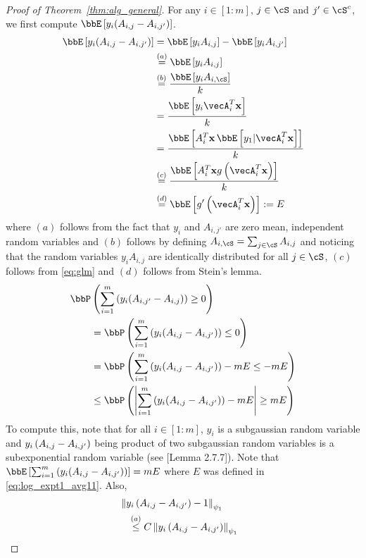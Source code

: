 \begin{proof}[Proof of Theorem~\ref{thm:alg_general}]
For any $i\in[1:m]$, $j\in\cS$ and $j'\in \cS^c$, we first compute $\bbE\insq{y_i (A_{i,j}-A_{i,j'})}$.
\begin{align}
\bbE\insq{y_i (A_{i,j}-A_{i,j'})} &= \bbE\insq{y_i A_{i,j}}-\bbE\insq{y_iA_{i,j'}}\nonumber\\
& \stackrel{(a)}{=} \bbE\insq{y_i A_{i,j}} \label{eq:log_expt11}\\
&\stackrel{(b)}{=}\frac{\bbE\insq{y_iA_{i,\cS}}}{k}\nonumber\\
& = \frac{\bbE\insq{y_i\vecA_{i}^T\bx}}{k}\nonumber\\
&= \frac{\bbE\insq{A_{i}^T\bx\,\bbE\insq{y_1|\vecA_i^T\bx}}}{k}\nonumber\\
& \stackrel{(c)}{=} \frac{\bbE\insq{A_{i}^T\bx g\inp{\vecA_i^T\bx}}}{k}\nonumber\\
& \stackrel{(d)}{=} {\bbE\insq{ g'\inp{\vecA_i^T\bx}}}:= E\label{eq:log_expt1_avg11}
\end{align} where $(a)$ follows from the fact that $y_i$ and  $A_{i,j'}$ are zero mean, independent random variables and $(b)$ follows by defining $A_{i,\cS} = \sum_{j\in \cS}A_{i,j}$ and noticing that the random variables $y_i A_{i,j}$ are identically distributed for all $j\in \cS$, $(c)$ follows from \eqref{eq:glm} and $(d)$ follows from Stein's lemma. 
\begin{align*}
\bbP&\inp{\sum_{i=1}^m{ \inp{y_i (A_{i,j'}-A_{i,j})}}\geq 0}\\
&=\bbP\inp{\sum_{i=1}^m{ \inp{y_i (A_{i,j}-A_{i,j'})}}\leq 0}\\
& = \bbP\inp{\sum_{i=1}^m{ \inp{y_i (A_{i,j}-A_{i,j'})}} - mE\leq -mE}\\
& \leq \bbP\inp{\left|\sum_{i=1}^m{ \inp{y_i (A_{i,j}-A_{i,j'})}} - mE\right|\geq mE}\\
\end{align*}
\vspace{-0.001cm}
To compute this, note that for all $i\in [1:m]$, $y_i$  is a subgaussian random variable and ${y_i}\left(A_{i, j}-A_{i, j'}\right)$ being product of two subgaussian random variables is a subexponential random variable (see [Lemma 2.7.7]\cite{vershynin}). Note that $\bbE\insq{\sum_{i=1}^m{ \inp{y_i (A_{i,j}-A_{i,j'})}}} = mE$ where $E$ was defined in \eqref{eq:log_expt1_avg11}.
Also, 
\begin{align*}
&\hspace{-0.3cm}\normi{{y_i}\inp{A_{i, j}-A_{i, j'}} - 1}_{\psi_1}\\
&\stackrel{(a)}{\leq} C\normi{{y_i}\inp{A_{i, j}-A_{i, j'}}}_{\psi_1}\\

\end{align*}
\end{proof}
